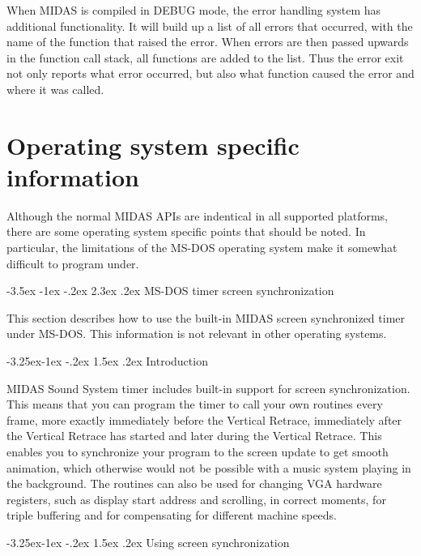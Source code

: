 \documentclass[a4paper,12pt,oneside]{book}
\makeatletter
\renewcommand\section{\@startsection {section}{1}{-20pt}%
                                   {-3.5ex \@plus -1ex \@minus -.2ex}%
                                   {2.3ex \@plus.2ex}%
                                   {\normalfont\Large\bfseries}}
\renewcommand\subsection{\@startsection{subsection}{2}{-20pt}%
                                     {-3.25ex\@plus -1ex \@minus -.2ex}%
                                     {1.5ex \@plus .2ex}%
                                     {\normalfont\large\bfseries}}
\makeatother
\begin{document}
When MIDAS is compiled in DEBUG mode, the error handling system has
additional functionality. It will build up a list of all errors that
occurred, with the name of the function that raised the error. When errors
are then passed upwards in the function call stack, all functions are added
to the list. Thus the error exit not only reports what error occurred, but
also what function caused the error and where it was called.



\chapter{Operating system specific information}

Although the normal MIDAS APIs are indentical in all supported platforms,
there are some operating system specific points that should be noted. In
particular, the limitations of the MS-DOS operating system make it somewhat
difficult to program under.


\section{MS-DOS timer screen synchronization}

This section describes how to use the built-in MIDAS screen synchronized
timer under MS-DOS. This information is not relevant in other operating
systems.

\subsection{Introduction}

MIDAS Sound System timer includes built-in support for screen
synchronization. This means that you can program the timer to call your own
routines every frame, more exactly immediately before the Vertical Retrace,
immediately after the Vertical Retrace has started and later during the
Vertical Retrace. This enables you to synchronize your program to the screen
update to get smooth animation, which otherwise would not be possible with a
music system playing in the background.  The routines can also be used for
changing VGA hardware registers, such as display start address and scrolling,
in correct moments, for triple buffering and for compensating for different
machine speeds.


\subsection{Using screen synchronization}
\end{document}
